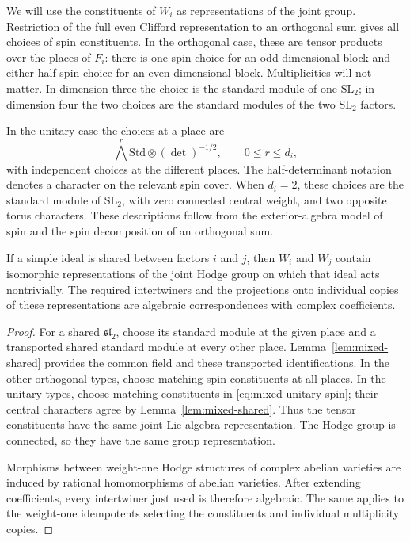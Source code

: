 We will use the constituents of $W_i$ as representations of the joint
group.  Restriction of the full even Clifford representation to an
orthogonal sum gives all choices of spin constituents.  In the
orthogonal case, these are tensor products over the places of $F_i$:
there is one spin choice for an odd-dimensional block and either
half-spin choice for an even-dimensional block.  Multiplicities will
not matter.  In dimension three the choice is the standard module of
one $\mathrm{SL}_2$; in dimension four the two choices are the
standard modules of the two $\mathrm{SL}_2$ factors.

In the unitary case the choices at a place are
\begin{equation}\label{eq:mixed-unitary-spin}
 \bigwedge^r\mathrm{Std}\otimes(\det)^{-1/2},
       \qquad 0\le r\le d_i,
\end{equation}
with independent choices at the different places.  The half-determinant
notation denotes a character on the relevant spin cover.  When $d_i=2$,
these choices are the standard module of $\mathrm{SL}_2$, with zero
connected central weight, and two opposite torus characters.  These
descriptions follow from the exterior-algebra model of spin and the
spin decomposition of an orthogonal sum.

\begin{lemma}\label{lem:mixed-constituents}
If a simple ideal is shared between factors $i$ and $j$, then $W_i$
and $W_j$ contain isomorphic representations of the joint Hodge group
on which that ideal acts nontrivially.  The required intertwiners and
the projections onto individual copies of these representations are
algebraic correspondences with complex coefficients.
\end{lemma}

\begin{proof}
For a shared $\mathfrak{sl}_2$, choose its standard module at the
given place and a transported shared standard module at every other
place.  Lemma~\ref{lem:mixed-shared} provides the common field and
these transported identifications.  In the other orthogonal types,
choose matching spin constituents at all places.  In the unitary
types, choose matching constituents in
\eqref{eq:mixed-unitary-spin}; their central characters agree by
Lemma~\ref{lem:mixed-shared}.  Thus the tensor constituents have the
same joint Lie algebra representation.  The Hodge group is connected,
so they have the same group representation.

Morphisms between weight-one Hodge structures of complex abelian
varieties are induced by rational homomorphisms of abelian varieties.
After extending coefficients, every intertwiner just used is therefore
algebraic.  The same applies to the weight-one idempotents selecting
the constituents and individual multiplicity copies.
\end{proof}

